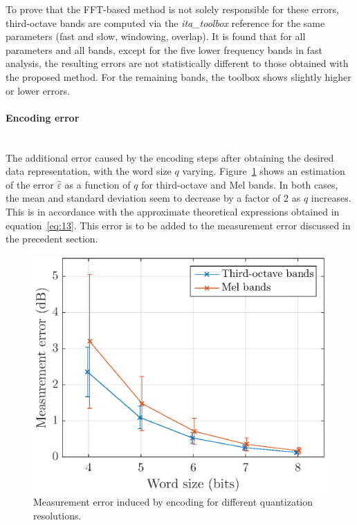 \documentclass[12pt,times,onecolumn]{article}
\begin{document}
To prove that the FFT-based method is not solely responsible for these errors, third-octave bands are computed via the \textit{ita\_toolbox} reference for the same parameters (fast and slow, windowing, overlap). It is found that for all parameters and all bands, except for the five lower frequency bands in fast analysis, the resulting errors are not statistically different to those obtained with the proposed method. For the remaining bands, the toolbox shows slightly higher or lower errors.

\paragraph{Encoding error\\\\}
The additional error caused by the encoding steps after obtaining the desired data representation, with the word size $q$ varying. Figure~\ref{fig:error_q} shows an estimation of the error $\hat{\varepsilon}$ as a function of $q$ for third-octave and Mel bands. In both cases, the mean and standard deviation seem to decrease by a factor of 2 as $q$ increases. This is in accordance with the approximate theoretical expressions obtained in equation~\ref{eq:13}. This error is to be added to the measurement error discussed in the precedent section.

\begin{figure}[htbp]
	\centering
		\includegraphics[width=0.7\columnwidth]{figures/error_qall.eps}
	\caption{Measurement error induced by encoding for different quantization resolutions.}
	\label{fig:error_q}
\end{figure}
\end{document}
